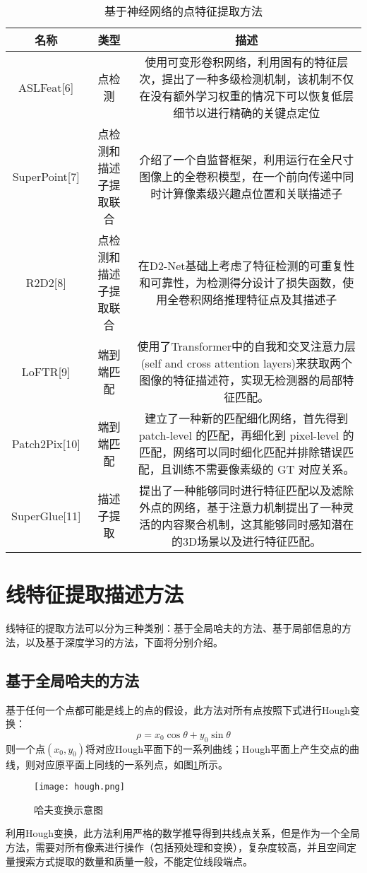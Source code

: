 \begin{table}[!ht]
  \centering
  \begin{tabular}{|c|c|c|}
  \hline
      名称 & 类型 & 描述 \\ \hline
      ASLFeat[6] & 点检测 & \parbox[c][16ex]{7cm}{使用可变形卷积网络，利用固有的特征层次，提出了一种多级检测机制，该机制不仅在没有额外学习权重的情况下可以恢复低层细节以进行精确的关键点定位} \\ \hline
      SuperPoint[7] & 点检测和描述子提取联合 & \parbox[c][13ex]{7cm}{介绍了一个自监督框架，利用运行在全尺寸图像上的全卷积模型，在一个前向传递中同时计算像素级兴趣点位置和关联描述子} \\ \hline
      R2D2[8] & 点检测和描述子提取联合 & \parbox[c][13ex]{7cm}{在D2-Net基础上考虑了特征检测的可重复性和可靠性，为检测得分设计了损失函数，使用全卷积网络推理特征点及其描述子} \\ \hline
      LoFTR[9] & 端到端匹配 &\parbox[c][13ex]{7cm}{ 使用了Transformer中的自我和交叉注意力层(self and cross attention layers)来获取两个图像的特征描述符，实现无检测器的局部特征匹配。} \\ \hline
      Patch2Pix[10] & 端到端匹配 & \parbox[c][16ex]{7cm}{建立了一种新的匹配细化网络，首先得到 patch-level 的匹配，再细化到 pixel-level 的匹配，网络可以同时细化匹配并排除错误匹配，且训练不需要像素级的 GT 对应关系。} \\ \hline
      SuperGlue[11] & 描述子提取 & \parbox[c][16ex]{7cm}{提出了一种能够同时进行特征匹配以及滤除外点的网络，基于注意力机制提出了一种灵活的内容聚合机制，这其能够同时感知潜在的3D场景以及进行特征匹配。} \\ \hline
  \end{tabular}
  \caption{基于神经网络的点特征提取方法}
  \label{tab_NNPoint}
\end{table}

\section{线特征提取描述方法}
线特征的提取方法可以分为三种类别：基于全局哈夫的方法、基于局部信息的方法，以及基于深度学习的方法，下面将分别介绍。
\subsection{基于全局哈夫的方法}
基于任何一个点都可能是线上的点的假设，此方法对所有点按照下式进行Hough变换：
\[
  \rho = x_0\cos{\theta}+y_0\sin{\theta}
\]
则一个点$(x_0,y_0)$将对应Hough平面下的一系列曲线；Hough平面上产生交点的曲线，则对应原平面上同线的一系列点，如图\ref{fig_hough}所示。
\begin{figure}
  \centering
  \texttt{[image: hough.png]}
  \label{fig_hough}
  \caption{哈夫变换示意图}
\end{figure}
利用Hough变换，此方法利用严格的数学推导得到共线点关系，但是作为一个全局方法，需要对所有像素进行操作（包括预处理和变换），复杂度较高，并且空间定量搜索方式提取的数量和质量一般，不能定位线段端点。


